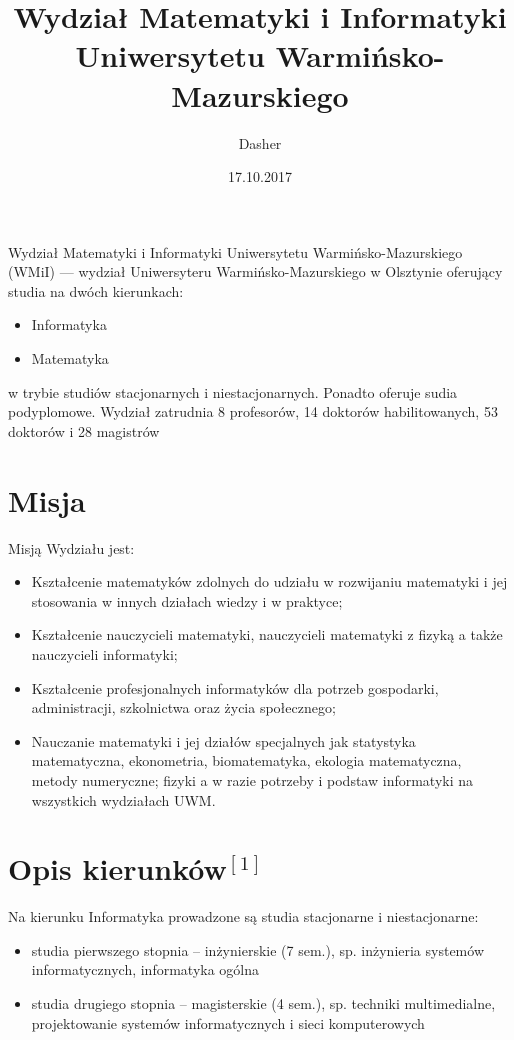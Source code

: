 \documentclass[a4paper,12pt]{article}
\title{Wydział Matematyki i Informatyki Uniwersytetu Warmińsko-Mazurskiego}
\author{Dasher}
\date{17.10.2017}
\begin{document}
\maketitle
Wydział Matematyki i Informatyki Uniwersytetu Warmińsko-Mazurskiego (WMiI) --- wydział Uniwersyteru Warmińsko-Mazurskiego w Olsztynie oferujący studia na dwóch kierunkach:

\begin{itemize}
\item Informatyka
\item Matematyka
\end{itemize}

\newline{}w trybie studiów stacjonarnych i niestacjonarnych. Ponadto oferuje sudia podyplomowe.
\newline{}
\newline{}Wydział zatrudnia 8 profesorów, 14 doktorów habilitowanych, 53 doktorów i 28 magistrów

\tableofcontents

\section{Misja}
Misją Wydziału jest:

\begin{itemize}
\item Kształcenie matematyków zdolnych do udziału w rozwijaniu matematyki i jej stosowania w innych działach wiedzy i w praktyce;
\item Kształcenie nauczycieli matematyki, nauczycieli matematyki z fizyką a także nauczycieli informatyki;
\item Kształcenie profesjonalnych informatyków dla potrzeb gospodarki, administracji, szkolnictwa oraz życia
społecznego;
\item Nauczanie matematyki i jej działów specjalnych jak statystyka matematyczna, ekonometria,
biomatematyka, ekologia matematyczna, metody numeryczne; fizyki a w razie potrzeby i podstaw
informatyki na wszystkich wydziałach UWM.
\end{itemize}

\section{Opis kierunków$^{[1]}$}
Na kierunku Informatyka prowadzone są studia stacjonarne i niestacjonarne:

\begin{itemize}
\item studia pierwszego stopnia – inżynierskie (7 sem.), sp. inżynieria systemów informatycznych, informatyka ogólna
\item studia drugiego stopnia – magisterskie (4 sem.), sp. techniki multimedialne, projektowanie systemów informatycznych i sieci komputerowych
\end{itemize}
\end{document}

